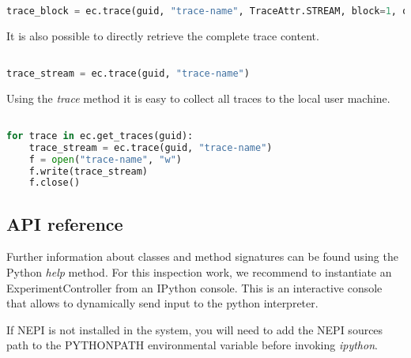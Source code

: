 \begin{lstlisting}[language=Python]

trace_block = ec.trace(guid, "trace-name", TraceAttr.STREAM, block=1, offset=0)

\end{lstlisting}

It is also possible to directly retrieve the complete trace content.

\begin{lstlisting}[language=Python]

trace_stream = ec.trace(guid, "trace-name")

\end{lstlisting}

Using the \emph{trace} method it is easy to collect all traces 
to the local user machine. 

\begin{lstlisting}[language=Python]

for trace in ec.get_traces(guid):
    trace_stream = ec.trace(guid, "trace-name")
    f = open("trace-name", "w")
    f.write(trace_stream)
    f.close()

\end{lstlisting}






\subsection{API reference}

Further information about classes and method signatures
can be found using the Python \emph{help} method.
For this inspection work, we recommend to instantiate an
ExperimentController from an IPython console. This is an
interactive console that allows to dynamically send input
to the python interpreter. 

If NEPI is not installed in the system, you will need to add the
NEPI sources path to the PYTHONPATH environmental variable 
before invoking \emph{ipython}.

